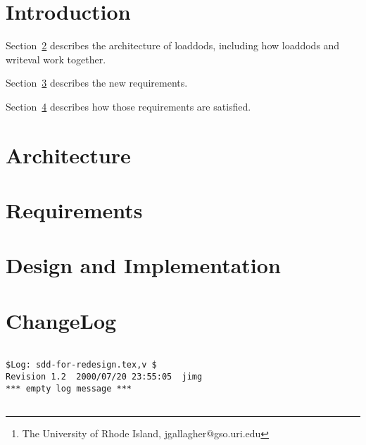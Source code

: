 \documentclass{article}
\begin{document}
\title{}
\author{James Gallagher\thanks{The University of Rhode Island,
    jgallagher@gso.uri.edu}}
\date{\today \\ $Revision$ }

\maketitle
\tableofcontents

\section{Introduction}

Section~\ref{sec:arch} describes the architecture of loaddods, including how
loaddods and writeval work together.

Section~\ref{sec:requirements} describes the new requirements.

Section~\ref{sec:design} describes how those requirements are satisfied.

\section{Architecture}
\label{sec:arch}

\begin{figure}
\begin{center}
\caption{}
\label{fig:loaddods-component}
\end{center}
\end{figure}

\section{Requirements}
\label{sec:requirements}

\section{Design and Implementation}
\label{sec:design}

\clearpage
\appendix

\section{ChangeLog}
\begin{verbatim}

$Log: sdd-for-redesign.tex,v $
Revision 1.2  2000/07/20 23:55:05  jimg
*** empty log message ***


\end{verbatim}
\end{document}
